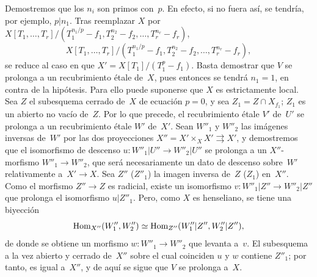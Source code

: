 Demostremos que los $n_i$ son primos con~$p$. En efecto, si no fuera
así, se tendría, por ejemplo, $p|n_1$. Tras reemplazar $X$ por
{$X[T_1,\dots,T_r]/(T_1^{n_1/p}-f_1,T_2^{n_2}-f_2,\dots,T_r^{n_r}-f_r)$,}
{$$X[T_1,\dots,T_r]/(T_1^{n_1/p}-f_1,T_2^{n_2}-f_2,\dots,T_r^{n_r}-f_r),$$}
se reduce al caso en que $X'=X[T_1]/(T_1^p-f_1)$. Basta demostrar que
$V$ se prolonga a un recubrimiento étale de~$X$, pues entonces se
tendrá $n_1=1$, en contra de la hipótesis. Para ello puede suponerse
que $X$ es estrictamente local. Sea $Z$ el subesquema cerrado de~$X$
de ecuación $p=0$, y sea $Z_1=Z\cap X_{f_1}$; $Z_1$ es un abierto no
vacío de~$Z$. Por lo que precede, el recubrimiento étale $V'$ de~$U'$
se prolonga a un recubrimiento étale $W'$ de~$X'$. Sean $W''_1$ y
$W''_2$ las imágenes inversas de~$W'$ por las dos proyecciones
$X''=X'\times_X X'\rightrightarrows X'$, y demostremos que el
isomorfismo de descenso $u\colon W''_1|U''\to W''_2|U''$ se prolonga
a un $X''$-morfismo $W''_1\to W''_2$, que será necesariamente un dato
de descenso sobre~$W'$ relativamente a~$X'\to X$. Sea $Z''$
(\resp $Z''_1$) la imagen inversa de~$Z$ (\resp $Z_1$) en~$X''$. Como
el morfismo $Z''\to Z$ es radicial, existe un isomorfismo
$v\colon W''_1|Z''\to W''_2|Z''$ que prolonga el isomorfismo
$u|Z''_1$. Pero, como $X$ es henseliano, se tiene una biyección
$$
\operatorname{Hom}_{X''}(W''_1,W''_2)\simeq\operatorname{Hom}_{Z''}(W''_1|Z'',W_2''|Z''),
$$
de donde se obtiene un morfismo $w\colon W''_1\to W''_2$ que levanta
a~$v$. El subesquema a la vez abierto
y cerrado de~$X''$ sobre el cual coinciden $u$ y $w$ contiene
$Z''_1$; por tanto, es igual a~$X''$, y de aquí se sigue que $V$ se
prolonga a~$X$.
